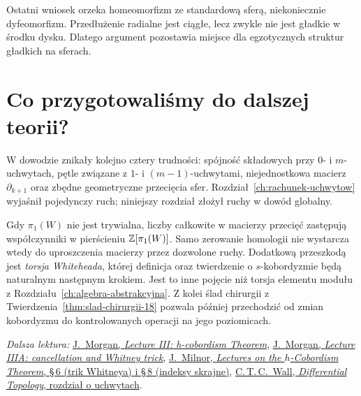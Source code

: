 \begin{uwaga}
Ostatni wniosek orzeka
homeomorfizm ze standardową
sferą, niekoniecznie
dyfeomorfizm. Przedłużenie
radialne jest ciągłe,
lecz zwykle nie jest
gładkie w środku dysku.
Dlatego argument pozostawia
miejsce dla egzotycznych
struktur gładkich
na sferach.
\end{uwaga}

\section{Co przygotowaliśmy do dalszej teorii?}
\label{sec:dalej-po-smale-19}

W dowodzie znikały kolejno
cztery trudności:
spójność składowych przy
$0$- i $m$-uchwytach,
pętle związane z
$1$- i $(m-1)$-uchwytami,
niejednostkowa macierz
$\partial_{k+1}$ oraz
zbędne geometryczne
przecięcia sfer.
Rozdział~\ref{ch:rachunek-uchwytow}
wyjaśnił pojedynczy ruch;
niniejszy rozdział złożył
ruchy w dowód globalny.

Gdy $\pi_1(W)$ nie jest
trywialna, liczby całkowite
w macierzy przecięć
zastępują współczynniki
w pierścieniu
$\mathbb{Z}[\pi_1(W)]$.
Samo zerowanie homologii
nie wystarcza wtedy
do uproszczenia macierzy
przez dozwolone ruchy.
Dodatkową przeszkodą
jest \emph{torsja Whiteheada},
której definicja oraz
twierdzenie o
$s$-kobordyzmie będą
naturalnym następnym
krokiem. Jest to inne
pojęcie niż torsja
elementu modułu
z Rozdziału~\ref{ch:algebra-abstrakcyjna}.
Z kolei ślad chirurgii
z Twierdzenia~\ref{thm:slad-chirurgii-18}
pozwala później
przechodzić od zmian
kobordyzmu do
kontrolowanych operacji
na jego poziomicach.

\par\smallskip
{\footnotesize\noindent\emph{Dalsza lektura:}
\href{https://www.math.columbia.edu/~jmorgan/Lecture_III_H-cobordism_Theorem.pdf}
{J.~Morgan, \emph{Lecture III: h-cobordism Theorem}},
\href{https://www.math.columbia.edu/~jmorgan/Lecture_IIIA_hcobordism_Contd.pdf}
{J.~Morgan, \emph{Lecture IIIA: cancellation and Whitney trick}},
\href{https://webhomes.maths.ed.ac.uk/~v1ranick/surgery/hcobord.pdf}
{J.~Milnor, \emph{Lectures on the $h$-Cobordism Theorem},
\S\,6 (trik Whitneya) i \S\,8 (indeksy skrajne)},
\href{https://www.cambridge.org/core/books/differential-topology/theory-of-handle-decompositions/BA54EF1BD9B755DFA2B363176B0CA2F7}
{C.\,T.\,C.~Wall, \emph{Differential Topology}, rozdział o uchwytach}.\par}
